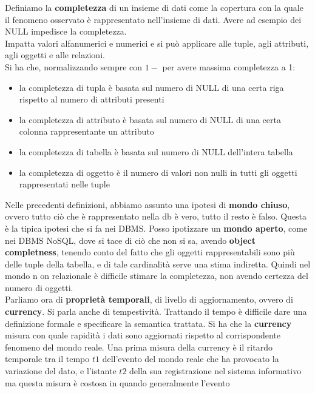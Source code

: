 \documentclass[a4paper,12pt, oneside]{book}
\begin{document}
\begin{definizione}
  Definiamo la \textbf{completezza} di un insieme di dati come
  la copertura con la quale il fenomeno osservato è rappresentato nell'insieme
  di dati. Avere ad esempio dei NULL impedisce la completezza.\\
  Impatta valori alfanumerici e numerici e si può applicare alle tuple, agli
  attributi, agli oggetti e alle relazioni.\\
  Si ha che, normalizzando sempre con $1-$ per avere massima completezza a 1:
  \begin{itemize}
    \item la completezza di tupla è basata sul numero di NULL di una certa riga
    rispetto al numero di attributi presenti
    \item la completezza di attributo è basata sul numero di NULL di una certa
    colonna rappresentante un attributo
    \item la completezza di tabella è basata sul numero di NULL dell'intera
    tabella 
    \item la completezza di oggetto è il numero di valori non nulli in tutti gli
    oggetti rappresentati nelle tuple 
  \end{itemize}
\end{definizione}
Nelle precedenti definizioni, abbiamo assunto una ipotesi di \textbf{mondo
  chiuso}, ovvero tutto
ciò che è rappresentato nella db è vero, tutto il resto è falso. Questa è
la tipica ipotesi che si fa nei DBMS. Posso ipotizzare un \textbf{mondo aperto},
come nei DBMS NoSQL, dove si tace di ciò che non si sa, avendo \textbf{object
  completness}, tenendo conto del fatto che gli oggetti rappresentabili sono
più delle tuple della tabella, e di tale cardinalità serve una stima
indiretta. Quindi nel mondo n on relazionale è difficile stimare la completezza,
non avendo certezza del numero di oggetti.  \\
Parliamo ora di \textbf{proprietà temporali}, di livello di aggiornamento,
ovvero di \textbf{currency}. Si parla anche di tempestività. Trattando il tempo
è difficile dare una definizione formale e specificare la semantica trattata. Si
ha che la \textbf{currency} misura con quale rapidità i dati sono aggiornati
rispetto 
al corrispondente fenomeno del mondo reale. Una prima misura della currency è
il ritardo temporale tra il tempo $t1$ dell’evento del mondo reale che ha
provocato la variazione del dato, e l’istante $t2$ della sua registrazione nel
sistema informativo ma questa misura è costosa in quando generalmente l'evento
\end{document}
